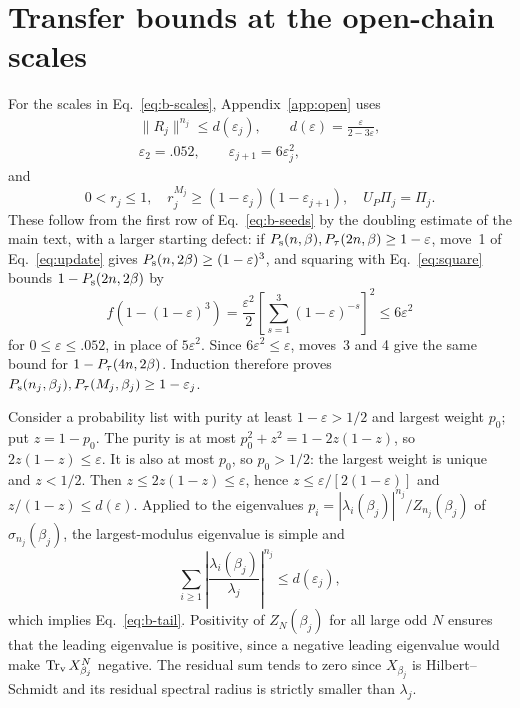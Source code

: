 \documentclass[aps,prl,reprint,amsmath,amssymb,nofootinbib,raggedbottom]{revtex4-2}
\begin{document}
\section{Transfer bounds at the open-chain scales}\label{app:b-periodic}
For the scales in Eq.~\eqref{eq:b-scales}, Appendix~\ref{app:open} uses
\begin{equation}
 \begin{gathered}
 \|R_j\|^{n_j}\le d(\varepsilon_j),\qquad d(\varepsilon)=\frac{\varepsilon}{2-3\varepsilon},\\
 \varepsilon_2=.052,\qquad \varepsilon_{j+1}=6\varepsilon_j^2,
 \end{gathered}
 \label{eq:b-tail}
\end{equation}
and
\begin{equation}
 0<r_j\le1,\quad r_j^{M_j}\ge(1-\varepsilon_j)(1-\varepsilon_{j+1}),\quad
 U_P\Pi_j=\Pi_j.
 \label{eq:b-ratios}
\end{equation}
These follow from the first row of Eq.~\eqref{eq:b-seeds} by the doubling
estimate of the main text, with a larger starting defect: if
$P_{\mathrm s}(n,\beta),P_{\tau}(2n,\beta)\ge1-\varepsilon$, move~1 of Eq.~\eqref{eq:update}
gives $P_{\mathrm s}(n,2\beta)\ge(1-\varepsilon)^3$, and squaring with Eq.~\eqref{eq:square} bounds $1-P_{\mathrm s}(2n,2\beta)$ by
\begin{equation}
 f(1-(1-\varepsilon)^3)=\frac{\varepsilon^2}{2}
 \left[\sum_{s=1}^3(1-\varepsilon)^{-s}\right]^2\le6\varepsilon^2
 \label{eq:b-periodic-six}
\end{equation}
for $0\le\varepsilon\le.052$, in place of $5\varepsilon^2$. Since $6\varepsilon^2\le\varepsilon$,
moves~3 and 4 give the same bound for $1-P_{\tau}(4n,2\beta)$.
Induction therefore proves
$P_{\mathrm s}(n_j,\beta_j),P_{\tau}(M_j,\beta_j)\ge1-\varepsilon_j$.

Consider a probability list with purity at least $1-\varepsilon>1/2$ and
largest weight $p_0$; put $z=1-p_0$. The purity is at most
$p_0^2+z^2=1-2z(1-z)$, so $2z(1-z)\le\varepsilon$. It is also at most $p_0$,
so $p_0>1/2$: the largest weight is unique and $z<1/2$. Then
$z\le2z(1-z)\le\varepsilon$, hence $z\le\varepsilon/[2(1-\varepsilon)]$ and $z/(1-z)\le d(\varepsilon)$.
Applied to the eigenvalues $p_i=|\lambda_i(\beta_j)|^{n_j}/Z_{n_j}(\beta_j)$ of $\sigma_{n_j}(\beta_j)$,
the largest-modulus eigenvalue is simple and
\begin{equation}
 \sum_{i\ge1}\left|\frac{\lambda_i(\beta_j)}{\lambda_j}\right|^{n_j}
 \le d(\varepsilon_j),
 \label{eq:b-full-tail}
\end{equation}
which implies Eq.~\eqref{eq:b-tail}.
Positivity of $Z_N(\beta_j)$ for all large odd $N$ ensures that the leading eigenvalue is positive, since a negative leading eigenvalue would make $\operatorname{Tr}_{\mathrm v} X_{\beta_j}^N$ negative.
The residual sum tends to zero since $X_{\beta_j}$ is Hilbert--Schmidt
and its residual spectral radius is strictly smaller than $\lambda_j$.
\end{document}
